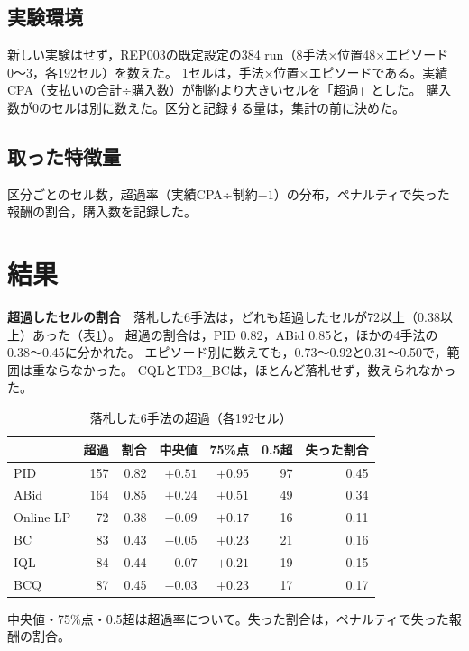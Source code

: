 \documentclass[twocolumn, 11pt]{ujarticle}
\begin{document}
\subsection{実験環境}\label{sec:e-env}

新しい実験はせず，REP003の既定設定の384 run（8手法×位置48×エピソード0〜3，各192セル）を数えた。
1セルは，手法×位置×エピソードである。実績CPA（支払いの合計÷購入数）が制約より大きいセルを「超過」とした。
購入数が0のセルは別に数えた。区分と記録する量は，集計の前に決めた。

\subsection{取った特徴量}\label{sec:e-feat}

区分ごとのセル数，超過率（実績CPA÷制約$-1$）の分布，ペナルティで失った報酬の割合，購入数を記録した。

\section{結果}\label{sec:e-result}

\textbf{超過したセルの割合}　落札した6手法は，どれも超過したセルが72以上（0.38以上）あった（表\ref{tab:share}）。
超過の割合は，PID 0.82，ABid 0.85と，ほかの4手法の0.38〜0.45に分かれた。
エピソード別に数えても，0.73〜0.92と0.31〜0.50で，範囲は重ならなかった。
CQLとTD3\_BCは，ほとんど落札せず，数えられなかった。

\begin{table}[H]
\centering
\caption{落札した6手法の超過（各192セル）}
\label{tab:share}
\small\setlength{\tabcolsep}{2pt}
\begin{tabularx}{\linewidth}{@{}p{1.6cm}rrrrrr@{}}
\toprule
 & 超過 & 割合 & 中央値 & 75\%点 & 0.5超 & 失った割合 \\
\midrule
PID & 157 & 0.82 & $+0.51$ & $+0.95$ & 97 & 0.45 \\
ABid & 164 & 0.85 & $+0.24$ & $+0.51$ & 49 & 0.34 \\
Online LP & 72 & 0.38 & $-0.09$ & $+0.17$ & 16 & 0.11 \\
BC & 83 & 0.43 & $-0.05$ & $+0.23$ & 21 & 0.16 \\
IQL & 84 & 0.44 & $-0.07$ & $+0.21$ & 19 & 0.15 \\
BCQ & 87 & 0.45 & $-0.03$ & $+0.23$ & 17 & 0.17 \\
\bottomrule
\end{tabularx}
\par\smallskip
\raggedright 中央値・75\%点・0.5超は超過率について。失った割合は，ペナルティで失った報酬の割合。
\end{table}
\end{document}
